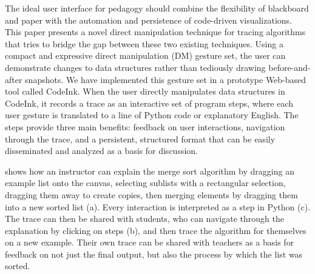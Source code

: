 The ideal user interface for pedagogy should combine the flexibility of
blackboard and paper with the automation and persistence of code-driven
visualizations. This paper presents a novel direct manipulation
technique for tracing algorithms that tries to bridge the gap between
these two existing techniques. Using a compact and expressive direct
manipulation (DM) gesture set, the user can demonstrate changes to data
structures rather than tediously drawing before-and-after snapshots. We
have implemented this gesture set in a prototype Web-based tool called
CodeInk. When the user directly manipulates data structures in CodeInk,
it records a trace as an interactive set of program steps, where each
user gesture is translated to a line of Python code or explanatory
English. The steps provide three main benefits: feedback on user
interactions, navigation through the trace, and a persistent, structured
format that can be easily disseminated and analyzed as a basis for
discussion.

 shows how an instructor can explain the merge
sort algorithm by dragging an example list onto the canvas, selecting
sublists with a rectangular selection, dragging them away to create
copies, then merging elements by dragging them into a new sorted list
(a). Every interaction is interpreted as a step
in Python (c). The trace can then be shared with
students, who can navigate through the explanation by clicking on steps
(b), and then trace the algorithm for themselves
on a new example. Their own trace can be shared with teachers as a basis
for feedback on not just the final output, but also the process by which
the list was sorted.



